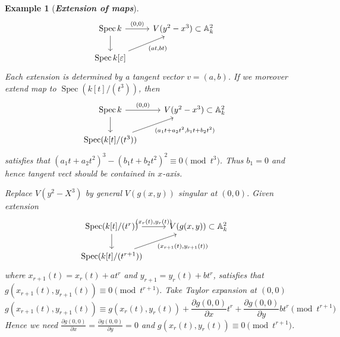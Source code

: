 \documentclass{ctexart}
\newtheorem{example}{Example}[section]
\newcommand{\spec}{\operatorname{Spec}}
\begin{document}
\begin{example}[\textbf{\emph{Extension of maps}}]
    \begin{equation}
        \begin{tikzcd}
            \spec k \arrow[r, "{(0, 0)}"] \arrow[d] &
            V(y^{2} - x^{3}) \subset \mathbb{A}_{k}^{2} \\
            \spec k[\varepsilon] \arrow[ur, "{(at, bt)}" swap] &
        \end{tikzcd}
    \end{equation}
    Each extension is determined by a tangent vector $v = (a, b)$.
    If we moreover extend map to $\spec(k[t]/(t^{3}))$, then
    \begin{equation}
        \begin{tikzcd}
            \spec k \arrow[r, "{(0, 0)}"] \arrow[d] &
            V(y^{2} - x^{3}) \subset \mathbb{A}_{k}^{2} \\
            \spec(k[t]/(t^{3})) \arrow[ur, "{(a_{1}t + a_{2}t^{2}, b_{1}t + b_{2}t^{2})}" swap] &
        \end{tikzcd}
    \end{equation}
    satisfies that $(a_{1}t + a_{2}t^{2})^{3} - (b_{1}t + b_{2}t^{2})^{2} \equiv 0 \pmod {t^{3}}$.
    Thus $b_{1} = 0$ and hence tangent vect should be contained in $x$-axis.
    \par
    Replace $V(y^{2} - X^{3})$ by general $V(g(x, y))$ singular at $(0, 0)$.
    Given extension
    \begin{equation}
        \begin{tikzcd}
            \spec(k[t]/(t^{r})) \arrow[r, "{(x_{r}(t), y_{r}(t))}"] \arrow[d] &
            V(g(x, y)) \subset \mathbb{A}_{k}^{2} \\
            \spec(k[t]/(t^{r + 1})) \arrow[ur, "{(x_{r + 1}(t), y_{r + 1}(t))}" swap] &
        \end{tikzcd}
    \end{equation}
    where $x_{r + 1}(t) = x_{r}(t) + at^{r}$ and $y_{r + 1} = y_{r}(t) + bt^{r}$,
    satisfies that $g(x_{r + 1}(t), y_{r + 1}(t)) \equiv 0 \pmod {t^{r + 1}}$.
    Take Taylor expansion at $(0, 0)$
    \begin{equation}
            g(x_{r + 1}(t) , y_{r + 1}(t)) \equiv g(x_{r}(t), y_{r}(t)) + \frac{\partial g(0, 0)}{\partial x}t^{r} + \frac{\partial g(0, 0)}{\partial y}bt^{r} \pmod {t^{r + 1}}
    \end{equation}
    Hence we need $\frac{\partial g(0, 0)}{\partial x} = \frac{\partial g(0, 0)}{\partial y} = 0$ and $g(x_{r}(t), y_{r}(t)) \equiv 0 \pmod {t^{r + 1}}$.
\end{example}
\end{document}
